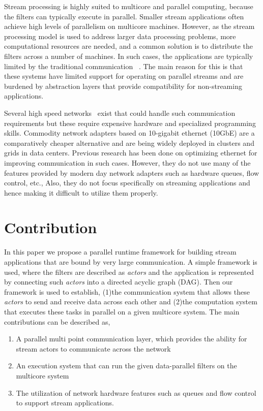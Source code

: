 \documentclass[10pt, conference, compsocconf, reqno]{IEEEtran}
\begin{document}
Stream processing is highly suited to multicore and parallel
computing, because the filters can typically execute in parallel.
Smaller stream applications often achieve high levels of parallelism
on multicore machines.  However, as the stream processing model
is used to address larger data processing problems, more computational
resources are needed, and a common solution is to distribute the
filters across a number of machines.
In such cases, the applications are typically limited by the
traditional communication
~\cite{Wu:2007:PPB:1323954.1323957,Wu:2007:PAL:1227865.1228021,Dobrescu09routebricks:exploiting,Han:2010:PGS:1851275.1851207,Kohler2000}.
The main reason for this is that these systems have limited support for operating on
parallel streams and are burdened by abstraction layers that provide
compatibility for non-streaming applications.

Several high speed networks~\cite{fredj2011survey} exist that could handle such communication requirements but these require expensive hardware and specialized programming skills. Commodity network adapters based on 10-gigabit ethernet (10GbE) are a comparatively cheaper alternative and are being widely deployed in clusters and grids in data centers. Previous research\cite{Romanow03anoverview,Feng:2003:OEN:1048935.1050200} has been done on optimizing ethernet for improving communication in such cases. However, they do not use many of the features provided by modern day network adapters such as hardware queues, flow control, etc., Also, they do not focus specifically on streaming applications and hence making it difficult to utilize them properly.

\section{Contribution}

In this paper we propose a parallel runtime framework for building stream applications that are bound by very large communication. A simple framework is used, where the filters are described as \textit{actors} and the application is represented by connecting such \textit{actors} into a directed acyclic graph (DAG). Then our framework is used to establish, (1)the communication system that allows these \textit{actors} to send and receive data across each other and (2)the computation system that executes these tasks in parallel on a given multicore system. The main contributions can be described as,

\begin{enumerate}
\item A parallel multi point communication layer, which provides the ability for stream actors to communicate across the network
\item An execution system that can run the given data-parallel filters on the multicore system
\item The utilization of network hardware features such as queues and flow control to support stream applications.

\end{enumerate}
\end{document}
